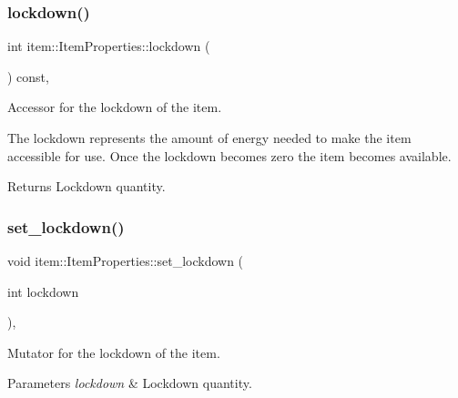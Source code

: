 \subsubsection{\texorpdfstring{lockdown()}{lockdown()}}
{\footnotesize\ttfamily int item\+::\+Item\+Properties\+::lockdown (\begin{DoxyParamCaption}{ }\end{DoxyParamCaption}) const\hspace{0.3cm}{\ttfamily [inline]}, {\ttfamily [noexcept]}}



Accessor for the lockdown of the item. 

The lockdown represents the amount of energy needed to make the item accessible for use. Once the lockdown becomes zero the item becomes available. \begin{DoxyReturn}{Returns}
Lockdown quantity. 
\end{DoxyReturn}
\mbox{\label{classitem_1_1_item_properties_aa29d6b35f5c5bbdc6920851bf734cf90}} 
\subsubsection{\texorpdfstring{set\+\_\+lockdown()}{set\_lockdown()}}
{\footnotesize\ttfamily void item\+::\+Item\+Properties\+::set\+\_\+lockdown (\begin{DoxyParamCaption}\item[{int}]{lockdown }\end{DoxyParamCaption})\hspace{0.3cm}{\ttfamily [inline]}, {\ttfamily [noexcept]}}



Mutator for the lockdown of the item. 


\begin{DoxyParams}{Parameters}
{\em lockdown} & Lockdown quantity. \\
\hline
\end{DoxyParams}
\mbox{\label{classitem_1_1_item_properties_ad51e71ee8a456e511c87a6e345acb839}} 
